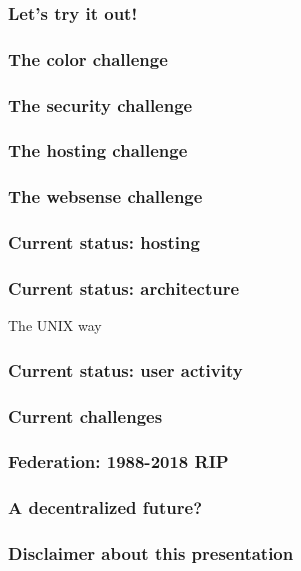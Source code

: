 \documentclass[aspectratio=169]{beamer}
\begin{document}
\begin{frame}
\frametitle{Let's try it out!}

\end{frame}

\begin{frame}
\frametitle{The color challenge}
\end{frame}

\begin{frame}
\frametitle{The security challenge}
\end{frame}

\begin{frame}
\frametitle{The hosting challenge}
\end{frame}

\begin{frame}
\frametitle{The websense challenge}
\end{frame}

\begin{frame}
\frametitle{Current status: hosting}
\end{frame}

\begin{frame}
\frametitle{Current status: architecture}
The UNIX way
\end{frame}

\begin{frame}
\frametitle{Current status: user activity}
\end{frame}

\begin{frame}
\frametitle{Current challenges}
\end{frame}


\begin{frame}
\frametitle{Federation: 1988-2018 RIP}
\end{frame}

\begin{frame}
\frametitle{A decentralized future?}
\end{frame}

\begin{frame}
\frametitle{Disclaimer about this presentation}
\end{frame}

\subtitle{Thank you}
\frame[plain]{\titlepage}
\end{document}
